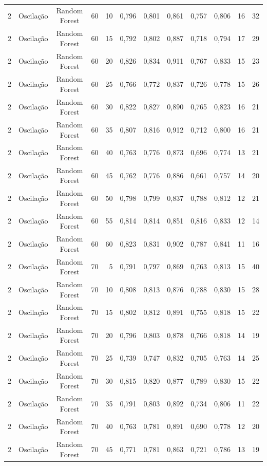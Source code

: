 \begin{longtable}{ccclrrrrrrrr}
2 & Oscilação & Random Forest & 60 & 10 & 0,796 & 0,801 & 0,861 & 0,757 & 0,806 & 16 & 32 \\
2 & Oscilação & Random Forest & 60 & 15 & 0,792 & 0,802 & 0,887 & 0,718 & 0,794 & 17 & 29 \\
2 & Oscilação & Random Forest & 60 & 20 & 0,826 & 0,834 & 0,911 & 0,767 & 0,833 & 15 & 23 \\
2 & Oscilação & Random Forest & 60 & 25 & 0,766 & 0,772 & 0,837 & 0,726 & 0,778 & 15 & 26 \\
2 & Oscilação & Random Forest & 60 & 30 & 0,822 & 0,827 & 0,890 & 0,765 & 0,823 & 16 & 21 \\
2 & Oscilação & Random Forest & 60 & 35 & 0,807 & 0,816 & 0,912 & 0,712 & 0,800 & 16 & 21 \\
2 & Oscilação & Random Forest & 60 & 40 & 0,763 & 0,776 & 0,873 & 0,696 & 0,774 & 13 & 21 \\
2 & Oscilação & Random Forest & 60 & 45 & 0,762 & 0,776 & 0,886 & 0,661 & 0,757 & 14 & 20 \\
2 & Oscilação & Random Forest & 60 & 50 & 0,798 & 0,799 & 0,837 & 0,788 & 0,812 & 12 & 21 \\
2 & Oscilação & Random Forest & 60 & 55 & 0,814 & 0,814 & 0,851 & 0,816 & 0,833 & 12 & 14 \\
2 & Oscilação & Random Forest & 60 & 60 & 0,823 & 0,831 & 0,902 & 0,787 & 0,841 & 11 & 16 \\
2 & Oscilação & Random Forest & 70 & 5 & 0,791 & 0,797 & 0,869 & 0,763 & 0,813 & 15 & 40 \\
2 & Oscilação & Random Forest & 70 & 10 & 0,808 & 0,813 & 0,876 & 0,788 & 0,830 & 15 & 28 \\
2 & Oscilação & Random Forest & 70 & 15 & 0,802 & 0,812 & 0,891 & 0,755 & 0,818 & 15 & 22 \\
2 & Oscilação & Random Forest & 70 & 20 & 0,796 & 0,803 & 0,878 & 0,766 & 0,818 & 14 & 19 \\
2 & Oscilação & Random Forest & 70 & 25 & 0,739 & 0,747 & 0,832 & 0,705 & 0,763 & 14 & 25 \\
2 & Oscilação & Random Forest & 70 & 30 & 0,815 & 0,820 & 0,877 & 0,789 & 0,830 & 15 & 22 \\
2 & Oscilação & Random Forest & 70 & 35 & 0,791 & 0,803 & 0,892 & 0,734 & 0,806 & 11 & 22 \\
2 & Oscilação & Random Forest & 70 & 40 & 0,763 & 0,781 & 0,891 & 0,690 & 0,778 & 12 & 20 \\
2 & Oscilação & Random Forest & 70 & 45 & 0,771 & 0,781 & 0,863 & 0,721 & 0,786 & 13 & 19 \\

\end{longtable}

